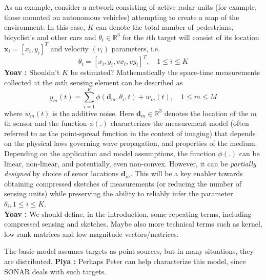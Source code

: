 \documentclass{article}
\newcommand{\comment}[3]{{\color{#1} {\bf #2 :} #3}}
\newcommand{\yoav}[1]{\comment{magenta}{Yoav}{#1}}
\newcommand{\piya}[1]{\comment{blue}{Piya}{#1}}
\newcommand{\rayan}[1]{\comment{red}{Rayan}{#1}}
\begin{document}
As an example, consider a network consisting of active radar units (for example, those mounted on autonomous vehicles) attempting to create a map of the environment. In this case, $K$ can denote the total number of pedestrians, bicyclist's and other cars and $\theta_i\in\mathbb{R}^3$ for the $i$th target will consist of its location $\mathbf{x}_i=[x_i,y_i]^T$ and velocity $(v_i)$ parameters, i.e.
\begin{equation} \theta_i = [ x_i, y_i, vx_i ,vy_i]^T, \quad 1\leq i\leq K  
\end{equation} 
\yoav{Shouldn't $K$ be estimated?}
Mathematically the space-time measurements collected at the $m$th sensing element can be described as \begin{equation} 
y_m (t) = \sum_{i=1}^{K} \phi (\mathbf{d}_m,\theta_i,t) + w_m(t), \quad 1\leq m\leq M
\end{equation}
where $w_m(t)$ is the additive noise. Here $\mathbf{d}_m\in \mathbb{R}^3$ denotes the location of the $m$th sensor and the function $\phi(.)$ characterizes the measurement model (often referred to as the point-spread function in the context of imaging) that depends on the physical laws governing wave propagation, and properties of the medium. Depending on the application and model assumptions, the function $\phi(.)$ can be linear, non-linear, and potentially, even non-convex. However, it can be {\em partially designed} by choice of senor locations $\mathbf{d}_m$. This will be a key enabler towards obtaining compressed sketches of measurements (or reducing the number of sensing units) while preserving the ability to reliably infer the parameter $\theta_i, 1\leq i\leq K$.\\
\yoav{We should define, in the introduction, some repeating terms, including compressed sensing and sketches. Maybe also more technical terms such as kernel, low rank matrices and low magnitude vectors/matrices.}

The basic model assumes targets as point sources, but in many situations, they are distributed. \piya{Perhaps Peter can help characterize this model, since SONAR deals with such targets}. 
\end{document}
